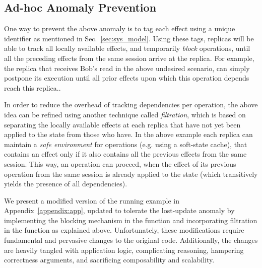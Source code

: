 %
\subsection{Ad-hoc Anomaly Prevention}
One way to prevent the above anomaly is to tag each effect using a
unique identifier as mentioned in Sec.~\ref{sec:sys_model}. Using
these tags, replicas will be able to track all locally available
effects, and temporarily \emph{block} operations, until all the
preceding effects from the same session arrive at the replica. For
example, the replica  that receives Bob's read in the above
undesired scenario, can simply postpone its execution until all prior
effects upon which this operation depends reach this replica..

In order to reduce the overhead of tracking dependencies per
operation, the above idea can be refined using another technique
called \emph{filtration}, which is based on separating the locally
available effects at each replica that have not yet been applied to
the state from those who have. In the above example each replica can
maintain a \emph{safe environment} for operations (e.g. using a
soft-state cache), that contains an effect only if it also contains
all the previous effects from the same session. This way, an operation
can proceed, when the effect of its  previous operation from the same
session is already applied to the state (which transitively yields the
presence of all dependencies).

We present a modified version of the running example in
Appendix~\ref{appendix:app}, updated to tolerate the lost-update
anomaly by implementing the blocking mechanism in the \readC{}
function and incorporating filtration in the \applyC{} function as
explained above. Unfortunately, these modifications require
fundamental and pervasive changes to the original code.  Additionally,
the changes are heavily tangled with application logic, complicating
reasoning, hampering correctness arguments, and sacrificing
composability and scalability.






